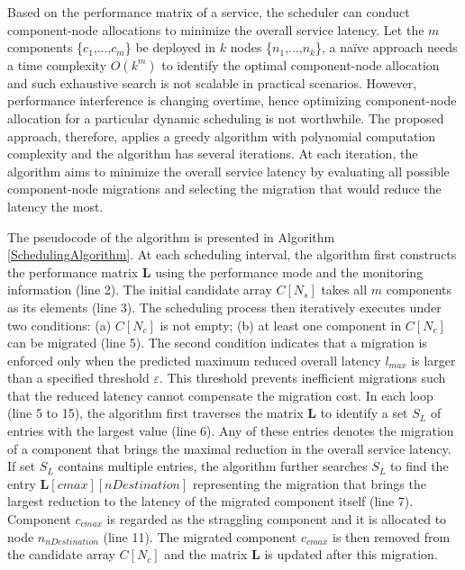 \documentclass[10pt, conference, compsocconf]{IEEEtran}
\begin{document}
Based on the performance matrix of a service, the scheduler can conduct component-node allocations to minimize the overall service latency. Let the $m$ components \{$c_1$,...,$c_m$\} be deployed in $k$ nodes \{$n_1$,...,$n_k$\}, a na\"{i}ve approach needs a time complexity $O(k^m)$ to identify the optimal component-node allocation and such exhaustive search is not scalable in practical scenarios. However, performance interference is changing overtime, hence optimizing component-node allocation for a particular dynamic scheduling is not worthwhile.
The proposed approach, therefore, applies a greedy algorithm with polynomial computation complexity and the algorithm has several iterations. At each iteration, the algorithm aims to minimize the overall service latency by evaluating all possible component-node migrations and selecting the migration that would reduce the latency the most.

The pseudocode of the algorithm is presented in Algorithm \ref{SchedulingAlgorithm}. At each scheduling interval, the algorithm first constructs the performance matrix $\textbf{L}$ using the performance mode and the monitoring information (line 2). The initial candidate array $C[N_s]$ takes all $m$ components as its elements (line 3). The scheduling process then iteratively executes under two conditions: (a) $C[N_c]$ is not empty; (b) at least one component in $C[N_c]$ can be migrated (line 5). The second condition indicates that a migration is enforced only when the predicted maximum reduced overall latency $l_{max}$ is larger than a specified threshold $\varepsilon$. This threshold prevents inefficient migrations such that the reduced latency cannot compensate the migration cost. In each loop (line 5 to 15), the algorithm first traverses the matrix $\textbf{L}$ to identify a set $S_L$ of entries with the largest value (line 6). Any of these entries denotes the migration of a component that brings the maximal reduction in the overall service latency. If set $S_L$ contains multiple entries,
the algorithm further searches $S_L$ to find the entry $\textbf{L}[cmax][nDestination]$ representing the migration that brings the largest reduction to the latency of the migrated component itself (line 7). Component $c_{cmax}$ is regarded as the straggling component and it is allocated to node $n_{nDestination}$ (line 11). The migrated component $c_{cmax}$ is then removed from the candidate array $C[N_c]$ and the matrix $\textbf{L}$ is updated after this migration.
\end{document}
